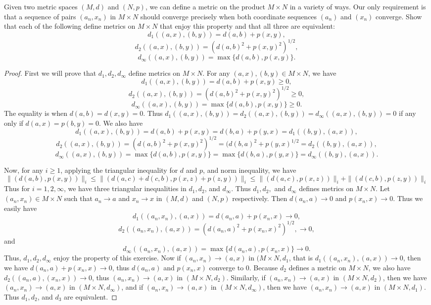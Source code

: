 \documentclass[12pt, a4paper]{article}
\theoremstyle{plain}
\begin{document}
\begin{exercise}{46}
Given two metric spaces $(M,d)$ and $(N,p)$, we can define a metric on the product $M\times N$ in a variety of ways. Our only requirement is that a sequence of pairs $(a_n,x_n)$ in $M\times N$ should converge precisely when both coordinate sequences $(a_n)$ and $(x_n)$ converge. Show that each of the following define metrics on $M\times N$ that enjoy this property and that all three are equivalent:
\[
d_1((a,x),(b,y))=d(a,b)+p(x,y),
\]
\[
d_2((a,x),(b,y))=(d(a,b)^2+p(x,y)^2)^{1/2},
\]
\[
d_\infty((a,x),(b,y))=\max\{d(a,b),p(x,y)\}.
\]
\end{exercise}
	\begin{proof}
	First we will prove that $d_1,d_2,d_\infty$ define metrics on $M\times N$. For any $(a,x),(b,y)\in M\times N$, we have 
	\[
d_1((a,x),(b,y))=d(a,b)+p(x,y)\geq 0,
\]
\[
d_2((a,x),(b,y))=(d(a,b)^2+p(x,y)^2)^{1/2}\geq 0,
\]
\[
d_\infty((a,x),(b,y))=\max\{d(a,b),p(x,y)\}\geq 0.
\]
	The equality is when $d(a,b)=d(x,y)=0$. Thus $d_1((a,x),(b,y))=d_2((a,x),(b,y))=d_\infty((a,x),(b,y))=0$ if any only if $d(a,x)=p(b,y)=0$. We also have
	\[
d_1((a,x),(b,y))=d(a,b)+p(x,y)=d(b,a)+p(y,x)=d_1((b,y),(a,x)),
\]
\[
d_2((a,x),(b,y))=(d(a,b)^2+p(x,y)^2)^{1/2}=(d(b,a)^2+p(y,x)^{1/2}=d_2((b,y),(a,x)),
\]
\[
d_\infty((a,x),(b,y))=\max\{d(a,b),p(x,y)\}=\max\{d(b,a),p(y,x)\}=d_\infty((b,y),(a,x)).
\]
	
	Now, for any $i\geq 1$, applying the triangular inequality for $d$ and $p$, and norm inequality, we have 
	\[
	\|(d(a,b),p(x,y))\|_i\leq \|(d(a,c)+d(c,b),p(x,z)+p(z,y))\|_i\leq \|(d(a,c),p(x,z))\|_i+\|(d(c,b),p(z,y))\|_i
	\]
	Thus for $i=1,2,\infty$, we have three triangular inequalities in $d_1,d_2$, and $d_\infty$. Thus $d_1,d_2,$ and $d_\infty$ defines metrics on $M\times N$.
	Let $(a_n,x_n)\in M\times N$ such that $a_n\rightarrow a$ and $x_n\rightarrow x$ in $(M,d)$ and $(N,p)$ respectively. Then $d(a_n,a)\rightarrow 0$ and $p(x_n,x)\rightarrow 0$. Thus we easily have 
	\[
	d_1((a_n,x_n),(a,x))=d(a_n,a)+p(x_n,x)\rightarrow 0,
	\]
	\[
d_2((a_n,x_n),(a,x))=(d(a_n,a)^2+p(x_n,x)^2)^{1/2},\rightarrow 0,
\]
and
\[
d_\infty((a_n,x_n),(a,x))=\max\{d(a_n,a),p(x_n,x)\}\rightarrow 0.
\]
Thus, $d_1,d_2,d_\infty$ enjoy the property of this exercise. Now if $(a_n,x_n)\rightarrow (a,x)$ in $(M\times N,d_1$, that is $d_1((a_n,x_n),(a,x))\rightarrow 0$, then we have $d(a_n,a)+p(x_n,x)\rightarrow 0$, thus $d(a_n,a)$ and $p(x_n,x)$ converge to $0$. Because $d_2$ defines a metric on $M\times N$, we also have $d_2((a_n,a),(x_n,x))\rightarrow 0$, thus $(a_n,x_n)\rightarrow (a,x)$ in $(M\times N,d_2)$. Similarly, if $(a_n,x_n)\rightarrow (a,x)$ in $(M\times N,d_2)$, then we have $(a_n,x_n)\rightarrow (a,x)$ in $(M\times N,d_\infty)$, and if $(a_n,x_n)\rightarrow (a,x)$ in $(M\times N,d_\infty)$, then we have $(a_n,x_n)\rightarrow (a,x)$ in $(M\times N,d_1)$. Thus $d_1,d_2$, and $d_3$ are equivalent.

	\end{proof}
\end{document}
